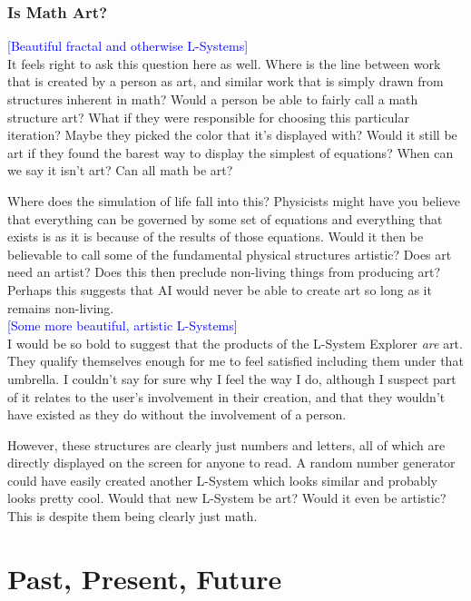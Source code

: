 \documentclass[12pt,twoside]{reedthesis}
\begin{document}
\subsection{Is Math Art?}

	\textcolor{blue}{[Beautiful fractal and otherwise L-Systems]}\\

	It feels right to ask this question here as well. Where is the line between work that is created by a person as art, and similar work that is simply drawn from structures inherent in math? Would a person be able to fairly call a math structure art? What if they were responsible for choosing this particular iteration? Maybe they picked the color that it's displayed with? Would it still be art if they found the barest way to display the simplest of equations? When can we say it isn't art? Can all math be art?
	
	Where does the simulation of life fall into this? Physicists might have you believe that everything can be governed by some set of equations and everything that exists is as it is because of the results of those equations. Would it then be believable to call some of the fundamental physical structures artistic? Does art need an artist? Does this then preclude non-living things from producing art? Perhaps this suggests that AI would never be able to create art so long as it remains non-living.\\
	
	\textcolor{blue}{[Some more beautiful, artistic L-Systems]}\\
	
	I would be so bold to suggest that the products of the L-System Explorer \textit{are} art. They qualify themselves enough for me to feel satisfied including them under that umbrella. I couldn't say for sure why I feel the way I do, although I suspect part of it relates to the user's involvement in their creation, and that they wouldn't have existed as they do without the involvement of a person.
	
	However, these structures are clearly just numbers and letters, all of which are directly displayed on the screen for anyone to read. A random number generator could have easily created another L-System which looks similar and probably looks pretty cool. Would that new L-System be art? Would it even be artistic? This is despite them being clearly just math.


\chapter{Past, Present, Future}
\end{document}
